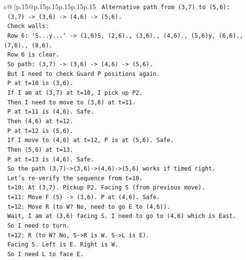 \documentclass{article}
\begin{document}
{\begin{supertabular}{c@{$\;$}|p{.15\linewidth}@{}p{.15\linewidth}p{.15\linewidth}p{.15\linewidth}p{.15\linewidth}p{.15\linewidth}}
{{{\texttt{          Alternative path from (3,7) to (5,6):} \\
\texttt{          (3,7) {-}> (3,6) {-}> (4,6) {-}> (5,6).} \\
\texttt{          Check walls:} \\
\texttt{          Row 6: `S...y...` {-}> (1,6)S, (2,6)., (3,6)., (4,6)., (5,6)y, (6,6)., (7,6)., (8,6).} \\
\texttt{          Row 6 is clear.} \\
\texttt{          So path: (3,7) {-}> (3,6) {-}> (4,6) {-}> (5,6).} \\
\texttt{          But I need to check Guard P positions again.} \\
\texttt{          P at t=10 is (3,6).} \\
\texttt{          If I am at (3,7) at t=10, I pick up P2.} \\
\texttt{          Then I need to move to (3,6) at t=11.} \\
\texttt{          P at t=11 is (4,6). Safe.} \\
\texttt{          Then (4,6) at t=12.} \\
\texttt{          P at t=12 is (5,6).} \\
\texttt{          If I move to (4,6) at t=12, P is at (5,6). Safe.} \\
\texttt{          Then (5,6) at t=13.} \\
\texttt{          P at t=13 is (4,6). Safe.} \\
\texttt{          So the path (3,7){-}>(3,6){-}>(4,6){-}>(5,6) works if timed right.} \\
\texttt{          Let's re{-}verify the sequence from t=10.} \\
\texttt{          t=10: At (3,7). Pickup P2. Facing S (from previous move).} \\
\texttt{          t=11: Move F (S) {-}> (3,6). P at (4,6). Safe.} \\
\texttt{          t=12: Move R (to W? No, need to go E to (4,6)).} \\
\texttt{          Wait, I am at (3,6) facing S. I need to go to (4,6) which is East.} \\
\texttt{          So I need to turn.} \\
\texttt{          t=12: R (to W? No, S{-}>R is W. S{-}>L is E).} \\
\texttt{          Facing S. Left is E. Right is W.} \\
\texttt{          So I need L to face E.} \\
}}}
\end{supertabular}}
\end{document}
